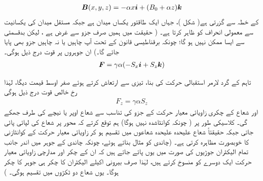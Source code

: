 \begin{align}
{\ensuremath{{\boldsymbol{B}}}} (x, y, z) = - \alpha x {\boldsymbol{i}} + (B_0 + \alpha z) {\boldsymbol{k}}
\end{align}
کے خطہ سے گزرتی ہے( شکل   )،   جہاں  ایک طاقتور یکساں میدان ہے جبکہ مستقل  میدان کی یکسانیت سے معمولی انحراف کو ظاہر کرتا ہے۔ ( حقیقت میں ہمیں صرف  جزو سے غرض ہے ، لیکن بدقسمتی سے ایسا ممکن نہیں ہو گا؛  چونکہ برقناطیسی قانون  کے تحت آپ چاہیں یا نہ چاہیں  جزو بھی پایا جائے گا۔)  ان جوہروں پر قوت درج ذیل ہوگی۔
\begin{align*}
{\ensuremath{{\boldsymbol{F}}}} = \gamma \alpha (- S_x {\boldsymbol{i}} + S_z {\boldsymbol{k}})
\end{align*}

 تاہم  کے گرد  لارمر استقبالی حرکت  کی بنا،   تیزی سے ارتعاش کرتے ہوئے   صفر  اوسط قیمت دیگا،  لہٰذا  رخ  خالص  قوت درج ذیل ہوگی 
\begin{align}\label{مساوات_تین_ابعادی_کونٹائی_زیڈ_قوت}
F_z = \gamma \alpha S_z
\end{align}
اور شعاع کے چکری زاویائی معیار حرکت کے  جزو کی تناسب سے شعاع اوپر یا نیچے کی طرف جھکے گی۔ کلاسیکی طور پر ( چونکہ  کوانٹاشدہ نہیں ہوگا)  ہم توقع کرتے کہ  محور پر شعاع کی لپائی پائی جاتی جبکہ حقیقتاً شعاع   علیحدہ علیحدہ  شعاعوں میں تقسیم ہو کر زاویائی  معیار حرکت کے کوانٹازنی کا خوبصورت مظاہرہ  کرتی ہے۔ (چاندی کو   مثال بناتے ہوئے،   چونکہ چاندی کے  جوہر  میں  اندر جانب تمام الیکٹران جوڑیوں کی صورت میں یوں  پائے جاتے ہیں کہ ان کے چکر اور مدارچی زاویائی معیار حرکت  ایک دوسرے کو منسوخ  کرتے ہیں، لہٰذا  صرف بیرونی اکیلے الیکٹران کا چکر  ہی جوہر کا چکر ہوگا۔  یوں  شعاع دو ٹکڑوں میں تقسیم ہوگی۔ )

